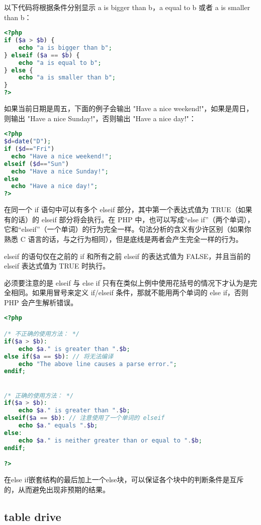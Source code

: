 以下代码将根据条件分别显示 a is bigger than b，a equal to b 或者 a is smaller than b：

\begin{lstlisting}[language=PHP]
<?php
if ($a > $b) {
    echo "a is bigger than b";
} elseif ($a == $b) {
    echo "a is equal to b";
} else {
    echo "a is smaller than b";
}
?>
\end{lstlisting}

如果当前日期是周五，下面的例子会输出 "Have a nice weekend!"，如果是周日，则输出 "Have a nice Sunday!"，否则输出 "Have a nice day!"：

\begin{lstlisting}[language=PHP]
<?php
$d=date("D");
if ($d=="Fri")
  echo "Have a nice weekend!"; 
elseif ($d=="Sun")
  echo "Have a nice Sunday!"; 
else
  echo "Have a nice day!"; 
?>
\end{lstlisting}

在同一个 if 语句中可以有多个 elseif 部分，其中第一个表达式值为 TRUE（如果有的话）的 elseif 部分将会执行。在 PHP 中，也可以写成“else if”（两个单词），它和“elseif”（一个单词）的行为完全一样。句法分析的含义有少许区别（如果你熟悉 C 语言的话，与之行为相同），但是底线是两者会产生完全一样的行为。

elseif 的语句仅在之前的 if 和所有之前 elseif 的表达式值为 FALSE，并且当前的 elseif 表达式值为 TRUE 时执行。

必须要注意的是 elseif 与 else if 只有在类似上例中使用花括号的情况下才认为是完全相同。如果用冒号来定义 if/elseif 条件，那就不能用两个单词的 else if，否则 PHP 会产生解析错误。

\begin{lstlisting}[language=PHP]
<?php

/* 不正确的使用方法： */
if($a > $b):
    echo $a." is greater than ".$b;
else if($a == $b): // 将无法编译
    echo "The above line causes a parse error.";
endif;


/* 正确的使用方法： */
if($a > $b):
    echo $a." is greater than ".$b;
elseif($a == $b): // 注意使用了一个单词的 elseif
    echo $a." equals ".$b;
else:
    echo $a." is neither greater than or equal to ".$b;
endif;

?>
\end{lstlisting}

在else if嵌套结构的最后加上一个else块，可以保证各个块中的判断条件是互斥的，从而避免出现非预期的结果。


\subsection{table drive}

